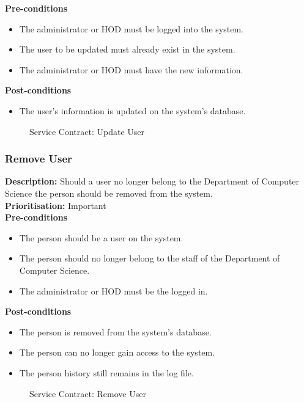 \documentclass[a4paper]{article}
\begin{document}
	\textbf{Pre-conditions}
	\begin{itemize}
		\item The administrator or HOD must be logged into the system.
		\item The user to be updated must already exist in the system.
		\item The administrator or HOD must have the new information.
	\end{itemize}
	
	\textbf{Post-conditions}
	\begin{itemize}
		\item The user's information is updated on the system's database.
	\end{itemize}
	
	\begin{figure}[H]
		\centering
		\caption{Service Contract: Update User}
	\end{figure}
	\pagebreak
	\subsubsection{Remove User}
	
	\textbf{Description:} Should a user no longer belong to the Department of Computer Science the person should be removed from the system.\\
	\textbf{Prioritisation:} Important\\
	
	\textbf{Pre-conditions}
	\begin{itemize}
		\item The person should be a user on the system.
		\item The person should no longer belong to the staff of the Department of Computer Science.
		\item The administrator or HOD must be the logged in.
	\end{itemize}
	
	\textbf{Post-conditions}
	\begin{itemize}
		\item The person is removed from the system's database.
		\item The person can no longer gain access to the system.
		\item The person history still remains in the log file.
	\end{itemize}
	
	\begin{figure}[H]
		\centering
		\caption{Service Contract: Remove User}
	\end{figure}
	\pagebreak
\end{document}
